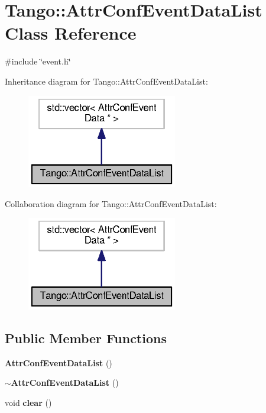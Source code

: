 \section{Tango\-:\-:Attr\-Conf\-Event\-Data\-List Class Reference}
\label{classTango_1_1AttrConfEventDataList}


{\ttfamily \#include \char`\"{}event.\-h\char`\"{}}



Inheritance diagram for Tango\-:\-:Attr\-Conf\-Event\-Data\-List\-:
\nopagebreak
\begin{figure}[H]
\begin{center}
\leavevmode
\includegraphics[width=186pt]{d6/d9d/classTango_1_1AttrConfEventDataList__inherit__graph}
\end{center}
\end{figure}


Collaboration diagram for Tango\-:\-:Attr\-Conf\-Event\-Data\-List\-:
\nopagebreak
\begin{figure}[H]
\begin{center}
\leavevmode
\includegraphics[width=186pt]{d6/de7/classTango_1_1AttrConfEventDataList__coll__graph}
\end{center}
\end{figure}
\subsection*{Public Member Functions}
\begin{DoxyCompactItemize}
\item 
{\bf Attr\-Conf\-Event\-Data\-List} ()
\item 
{\bf $\sim$\-Attr\-Conf\-Event\-Data\-List} ()
\item 
void {\bf clear} ()
\end{DoxyCompactItemize}


